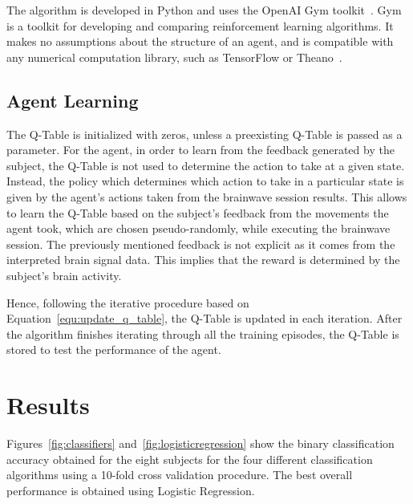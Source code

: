 \documentclass[journal]{IEEEtran}
\begin{document}
{{The algorithm is developed in Python and uses the OpenAI Gym toolkit~\cite{openai}. Gym is a toolkit for developing and comparing reinforcement learning algorithms. It makes no assumptions about the structure of an agent, and is compatible with any numerical computation library, such as TensorFlow or Theano~\cite{tensorflow2015-whitepaper}.

\subsection{Agent Learning}
\label{q_learning_step_alg}
The Q-Table is initialized with zeros, unless a preexisting Q-Table is passed as a parameter.  For the agent, in order to learn from the feedback generated by the subject, the Q-Table is not used to determine the action to take at a given state. Instead, the policy which determines which action to take in a particular state is given by the agent's actions taken from the brainwave session results. This allows to learn the Q-Table based on the subject's feedback from the movements the agent took, which are chosen pseudo-randomly, while executing the brainwave session. The previously mentioned feedback is not explicit as it comes from the interpreted brain signal data. This implies that the reward is determined by the subject's brain activity. 

Hence, following the iterative procedure based on Equation~\ref{equ:update_q_table}, the Q-Table is updated in each iteration.  After the algorithm finishes iterating through all the training episodes, the Q-Table is stored to test the performance of the agent.


\section{Results}
\label{results}

Figures~\ref{fig:classifiers} and~\ref{fig:logisticregression} show the binary classification accuracy obtained for the eight subjects for the four different classification algorithms using a 10-fold cross validation procedure.  The best overall performance is obtained using Logistic Regression.

}}
\end{document}
